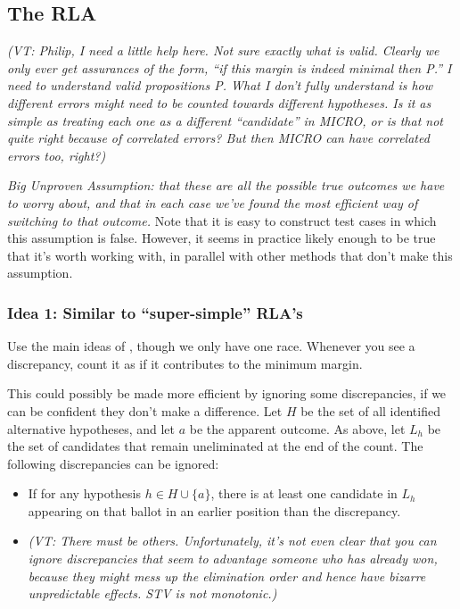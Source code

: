 \documentclass[10pt,a4paper]{article}
\newcommand{\VTNote}[1]{{\it(VT: #1)}}
\begin{document}
\subsection{The RLA}
\VTNote{Philip, I need a little help here.  Not sure exactly what is valid.  Clearly we only ever get assurances of the form, ``if this margin is indeed minimal then P.''  I need to understand valid propositions P.   What I don't fully understand is how different errors might need to be counted towards different hypotheses.  Is it as simple as treating each one as a different ``candidate'' in MICRO, or is that not quite right because of correlated errors?  But then MICRO can have correlated errors too, right?}

\emph{Big Unproven Assumption: that these are all the possible true outcomes we have to worry about, and that in each case we've found the most efficient way of switching to that outcome.}  Note that it is easy to construct test cases in which this assumption is false.  However, it seems in practice likely enough to be true that it's worth working with, in parallel with other methods that don't make this assumption.

\subsubsection{Idea 1: Similar to ``super-simple'' RLA's}
Use the main ideas of \cite{stark2010super}, though we only have one race.  Whenever you see a discrepancy, count it as if it contributes to the minimum margin.

This could possibly be made more efficient by ignoring some discrepancies, if we can be confident they don't make a difference.
Let $H$ be the set of all identified alternative hypotheses, and let $a$ be the apparent outcome.  As above, let $L_h$ be the set of candidates that remain uneliminated at the end of the count.  The following discrepancies can be ignored:
\begin{itemize}
\item If for any hypothesis $h \in H \cup \{a \}$, there is at least one candidate in $L_h$ appearing on that ballot in an earlier position than the discrepancy.
\item \VTNote{There must be others.  Unfortunately, it's not even clear that you can ignore discrepancies that seem to advantage someone who has already won, because they might mess up the elimination order and hence have bizarre unpredictable effects.  STV is not monotonic.}
\end{itemize}
\end{document}

